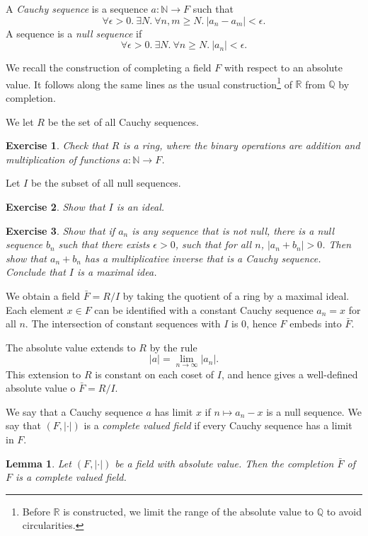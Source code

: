 \documentclass{amsart}
\newcommand{\ring}[1]{\mathbb{#1}}
\newtheorem{lemma}[equation]{Lemma}
\newtheorem{exercise}{Exercise}
\def\newterm#1{{\it #1}}
\def\abs#1{{|#1|}}
\begin{document}
A \newterm{Cauchy sequence} is a sequence $a:\ring{N}\to F$ such that
\[
\forall \epsilon>0.~ \exists N.~\forall n,m \ge N.~ |a_n - a_m|<\epsilon.
\]
A sequence is a \newterm{null sequence} if
\[
\forall\epsilon>0.~\exists N.~\forall n\ge N.~|a_n|<\epsilon.
\]

We recall the construction of completing a field $F$ with respect to
an absolute value.  It follows along the same lines as the usual
construction\footnote{Before $\ring{R}$ is constructed, we limit the
  range of the absolute value to $\ring{Q}$ to avoid circularities.}
of $\ring{R}$ from $\ring{Q}$ by completion.


We let $R$ be the set of all Cauchy sequences. 

\begin{exercise} Check that $R$ is a ring, where the binary operations
  are addition and multiplication of functions $a:\ring{N}\to F$.
\end{exercise}

Let $I$ be the subset
of all null sequences.  

\begin{exercise} Show that $I$ is an ideal.
\end{exercise}

\begin{exercise} 
Show that if $a_n$ is any sequence that is not null, there is a null sequence $b_n$
such that there exists $\epsilon>0$, such that for all $n$, $\abs{a_n+b_n}>0$.
Then show that $a_n+b_n$ has a multiplicative inverse that is a Cauchy sequence.
Conclude that $I$ is a maximal idea.
\end{exercise}

We obtain a field $\bar F = R/I$ by taking the quotient of a ring by a maximal ideal.
Each element $x\in F$ can be identified with a constant Cauchy sequence $a_n=x$ for all 
$n$.  The intersection of constant sequences with $I$ is $0$, hence $F$ embeds into $\bar F$.

The absolute value extends to $R$ by the rule
\[
\abs{a} = \lim_{n\to\infty} |a_n|.
\]
This extension to $R$ is constant on each coset of $I$, and hence gives a well-defined
absolute value o $\bar F = R/I$.

We say that a Cauchy sequence $a$ has limit $x$ if $n\mapsto a_n-x$ is a null sequence.
We say that $(F,\abs{\cdot})$ is a \newterm{complete valued field} if every Cauchy
sequence has a limit in $F$.

\begin{lemma}  Let $(F,\abs{\cdot})$ be a field with absolute value.
Then the completion $\bar F$ of $F$ is a complete valued field.
\end{lemma}
\end{document}
